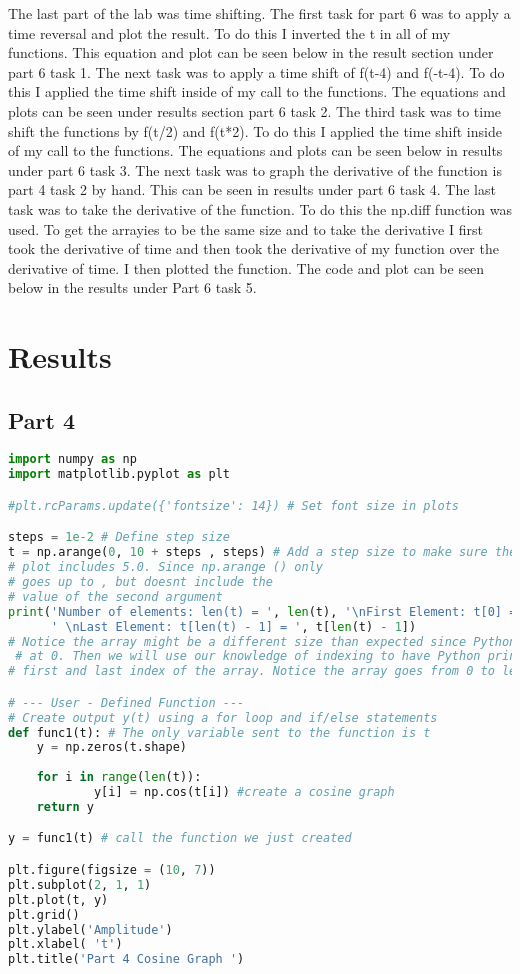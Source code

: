 \documentclass[11pt,a4]{report}
\begin{document}
The last part of the lab was time shifting. The first task for part 6 was to apply a time reversal and plot the result. To do this I inverted the t in all of my functions. This equation and plot can be seen below in the result section under part 6 task 1. The next task was to apply a time shift of f(t-4) and f(-t-4). To do this I applied the time shift inside of my call to the functions. The equations and plots can be seen under results section part 6 task 2. The third task was to time shift the functions by f(t/2) and f(t*2). To do this I applied the time shift inside of my call to the functions. The equations and plots can be seen below in results under part 6 task 3. The next task was to graph the derivative of the function is part 4 task 2 by hand. This can be seen in results under part 6 task 4. The last task was to take the derivative of the function. To do this the np.diff function was used. To get the arrayies to be the same size and to take the derivative I first took the derivative of time and then took the derivative of my function over the derivative of time. I then plotted the function. The code and plot can be seen below in the results under Part 6 task 5. 


\section{Results}
\subsection{Part 4}
\begin{lstlisting}[language=Python]
import numpy as np
import matplotlib.pyplot as plt

#plt.rcParams.update({'fontsize': 14}) # Set font size in plots

steps = 1e-2 # Define step size
t = np.arange(0, 10 + steps , steps) # Add a step size to make sure the
# plot includes 5.0. Since np.arange () only
# goes up to , but doesnt include the
# value of the second argument
print('Number of elements: len(t) = ', len(t), '\nFirst Element: t[0] = ', t[0], 
      ' \nLast Element: t[len(t) - 1] = ', t[len(t) - 1])
# Notice the array might be a different size than expected since Python starts
 # at 0. Then we will use our knowledge of indexing to have Python print the
# first and last index of the array. Notice the array goes from 0 to len() - 1

# --- User - Defined Function ---
# Create output y(t) using a for loop and if/else statements
def func1(t): # The only variable sent to the function is t
    y = np.zeros(t.shape)
    
    for i in range(len(t)):
            y[i] = np.cos(t[i]) #create a cosine graph
    return y

y = func1(t) # call the function we just created

plt.figure(figsize = (10, 7))
plt.subplot(2, 1, 1)
plt.plot(t, y)
plt.grid()
plt.ylabel('Amplitude')
plt.xlabel( 't')
plt.title('Part 4 Cosine Graph ')



\end{lstlisting}
\end{document}
